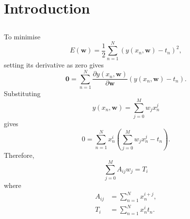 \section{Introduction}


\subsection{}
To minimise 
%
\begin{equation}
E(\mathbf{w}) = \frac{1}{2} \sum_{n = 1}^{N} \left( y(x_n, \mathbf{w}) - t_n \right) ^ 2,
\end{equation}
%
setting its derivative as zero gives
%
\begin{equation}
\mathbf{0} = \sum_{n = 1}^{N} \frac{\partial y(x_n, \mathbf{w})}{\partial \mathbf{w}} \left( y(x_n, \mathbf{w}) - t_n \right).
\end{equation}
%
Substituting 
%
\begin{equation}
y(x_n, \mathbf{w}) = \sum_{j = 0}^{M} w_j x_n^j
\end{equation}
%
gives
%
\begin{equation}
0 = \sum_{n = 1}^{N} x_n^i \left( \sum_{j = 0}^{M} w_j x_n^j - t_n \right).
\end{equation}
%
Therefore,
%
\begin{equation}
\sum_{j = 0}^{M} A_{ij} w_j = T_i
\end{equation}
%
where
%
\begin{equation}
\begin{aligned}
A_{ij} &= \sum_{n = 1}^{N} x_n^{i + j}, \\
T_i &= \sum_{n = 1}^{N} x_n^i t_n.
\end{aligned}
\end{equation}


